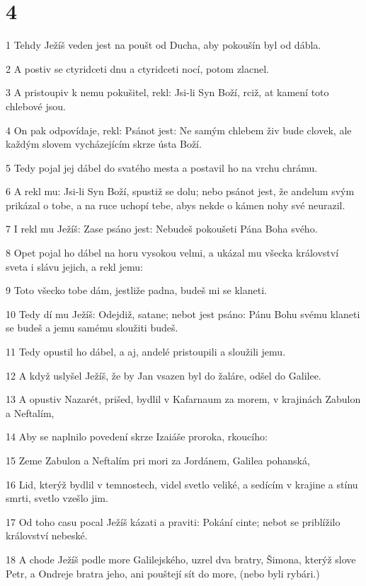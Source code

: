 \chapter{4}

\par 1 Tehdy Ježíš veden jest na poušt od Ducha, aby pokoušín byl od dábla.
\par 2 A postiv se ctyridceti dnu a ctyridceti nocí, potom zlacnel.
\par 3 A pristoupiv k nemu pokušitel, rekl: Jsi-li Syn Boží, rciž, at kamení toto chlebové jsou.
\par 4 On pak odpovídaje, rekl: Psánot jest: Ne samým chlebem živ bude clovek, ale každým slovem vycházejícím skrze ústa Boží.
\par 5 Tedy pojal jej dábel do svatého mesta a postavil ho na vrchu chrámu.
\par 6 A rekl mu: Jsi-li Syn Boží, spustiž se dolu; nebo psánot jest, že andelum svým prikázal o tobe, a na ruce uchopí tebe, abys nekde o kámen nohy své neurazil.
\par 7 I rekl mu Ježíš: Zase psáno jest: Nebudeš pokoušeti Pána Boha svého.
\par 8 Opet pojal ho dábel na horu vysokou velmi, a ukázal mu všecka království sveta i slávu jejich, a rekl jemu:
\par 9 Toto všecko tobe dám, jestliže padna, budeš mi se klaneti.
\par 10 Tedy dí mu Ježíš: Odejdiž, satane; nebot jest psáno: Pánu Bohu svému klaneti se budeš a jemu samému sloužiti budeš.
\par 11 Tedy opustil ho dábel, a aj, andelé pristoupili a sloužili jemu.
\par 12 A když uslyšel Ježíš, že by Jan vsazen byl do žaláre, odšel do Galilee.
\par 13 A opustiv Nazarét, prišed, bydlil v Kafarnaum za morem, v krajinách Zabulon a Neftalím,
\par 14 Aby se naplnilo povedení skrze Izaiáše proroka, rkoucího:
\par 15 Zeme Zabulon a Neftalím pri mori za Jordánem, Galilea pohanská,
\par 16 Lid, kterýž bydlil v temnostech, videl svetlo veliké, a sedícím v krajine a stínu smrti, svetlo vzešlo jim.
\par 17 Od toho casu pocal Ježíš kázati a praviti: Pokání cinte; nebot se priblížilo království nebeské.
\par 18 A chode Ježíš podle more Galilejského, uzrel dva bratry, Šimona, kterýž slove Petr, a Ondreje bratra jeho, ani pouštejí sít do more, (nebo byli rybári.)
